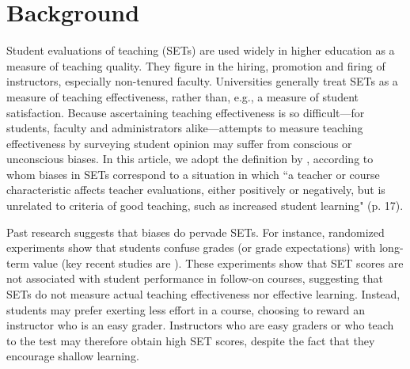 \documentclass[12pt]{article}
\begin{document}
\begin{quotation}
\begin{abstract}
%

\end{abstract}

\newpage

\end{quotation}

\section{Background}
Student evaluations of teaching (SETs) are used widely in higher education as a measure of teaching quality. They figure in the hiring, promotion and firing of instructors, especially non-tenured faculty. Universities generally treat SETs as a measure of teaching effectiveness, rather than, e.g., a measure of student satisfaction.
Because ascertaining teaching effectiveness is so difficult---for students,
faculty and administrators alike---attempts to measure teaching effectiveness by
surveying student opinion may suffer from conscious or unconscious biases. In this article, we adopt the definition by \citet{Centra2000}, according to whom biases in SETs correspond to a situation in which ``a teacher
or course characteristic affects teacher evaluations, either positively or
negatively, but is unrelated to criteria of good teaching, such as increased
student learning" (p. 17). 

Past research suggests that biases do pervade SETs. For instance, randomized experiments show that students confuse grades (or grade expectations) with long-term
value (key recent studies are \citet{Carrell2010a,Braga2014}). These experiments show that SET scores are not associated with student performance in follow-on courses, suggesting that SETs do not measure actual teaching effectiveness nor effective learning. Instead, students may prefer exerting less effort in a course, choosing to reward an instructor who is an easy grader. Instructors who are easy graders or who teach to the test may therefore obtain high SET scores, despite the fact that they encourage shallow learning.    
\end{document}
